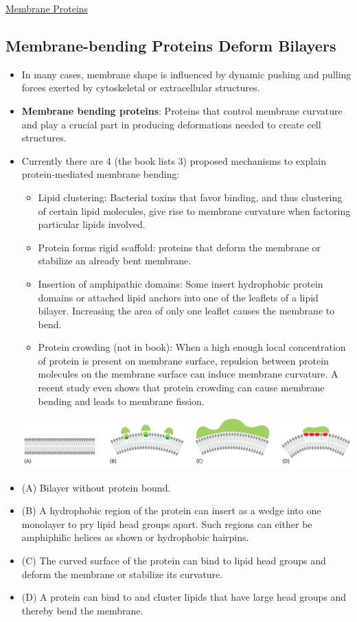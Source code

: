 \documentclass[12pt,letterpaper]{article}
\begin{document}
\begin{secbox}{\hyperlink{10}{Membrane Proteins}}
{    \subsection*{Membrane-bending Proteins Deform Bilayers}
    \begin{itemize}
        \item In many cases, membrane shape is influenced by dynamic pushing and pulling forces exerted by cytoskeletal or extracellular structures.
        \item \textbf{Membrane bending proteins}: Proteins that control membrane curvature and play a crucial part in producing deformations needed to create cell structures.
        \item Currently there are 4 (the book lists 3) proposed mechanisms to explain protein-mediated membrane bending:
            \begin{itemize}[label=$\circ$]
                \item Lipid clustering: Bacterial toxins that favor binding, and thus clustering of certain lipid molecules, give rise to membrane curvature when factoring particular lipids involved.
                \item Protein forms rigid scaffold: proteins that deform the membrane or stabilize an already bent membrane.
                \item Insertion of amphipathic domains: Some insert hydrophobic protein domains or attached lipid anchors into one of the leaflets of a lipid bilayer. Increasing the area of only one leaflet causes the membrane to bend.
                \item Protein crowding (not in book): When a high enough local concentration of protein is present on membrane surface, repulsion between protein molecules on the membrane surface can induce membrane curvature. A recent study even shows that protein crowding can cause membrane bending and leads to membrane fission.
            \end{itemize}
        \includegraphics[width=\linewidth]{images/figure_10_40.png}
        \item (A) Bilayer without protein bound. 
        \item (B) A hydrophobic region of the protein can insert as a wedge into one monolayer to pry lipid head groups apart. Such regions can either be amphiphilic helices as shown or hydrophobic hairpins. 
        \item (C) The curved surface of the protein can bind to lipid head groups and deform the membrane or stabilize its curvature. 
        \item (D) A protein can bind to and cluster lipids that have large head groups and thereby bend the membrane. 
    \end{itemize}

}
\end{secbox}
\end{document}

